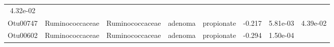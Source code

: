 \documentclass[11pt,]{article}
\begin{document}
\begin{longtable}[]{@{}cccccccc@{}}
\begin{minipage}[t]{0.08\columnwidth}
4.32e-02\strut
\end{minipage}\tabularnewline
\begin{minipage}[t]{0.08\columnwidth}\centering\strut
Otu00747\strut
\end{minipage} & \begin{minipage}[t]{0.15\columnwidth}\centering\strut
Ruminococcaceae\strut
\end{minipage} & \begin{minipage}[t]{0.15\columnwidth}\centering\strut
Ruminococcaceae\strut
\end{minipage} & \begin{minipage}[t]{0.08\columnwidth}\centering\strut
adenoma\strut
\end{minipage} & \begin{minipage}[t]{0.09\columnwidth}\centering\strut
propionate\strut
\end{minipage} & \begin{minipage}[t]{0.07\columnwidth}\centering\strut
-0.217\strut
\end{minipage} & \begin{minipage}[t]{0.08\columnwidth}\centering\strut
5.81e-03\strut
\end{minipage} & \begin{minipage}[t]{0.08\columnwidth}\centering\strut
4.39e-02\strut
\end{minipage}\tabularnewline
\begin{minipage}[t]{0.08\columnwidth}\centering\strut
Otu00602\strut
\end{minipage} & \begin{minipage}[t]{0.15\columnwidth}\centering\strut
Ruminococcaceae\strut
\end{minipage} & \begin{minipage}[t]{0.15\columnwidth}\centering\strut
Ruminococcaceae\strut
\end{minipage} & \begin{minipage}[t]{0.08\columnwidth}\centering\strut
adenoma\strut
\end{minipage} & \begin{minipage}[t]{0.09\columnwidth}\centering\strut
propionate\strut
\end{minipage} & \begin{minipage}[t]{0.07\columnwidth}\centering\strut
-0.294\strut
\end{minipage} & \begin{minipage}[t]{0.08\columnwidth}\centering\strut
1.50e-04\strut
\end{minipage} & \begin{minipage}[t]{0.08\columnwidth}\centering\strut

\end{minipage}
\end{longtable}
\end{document}
